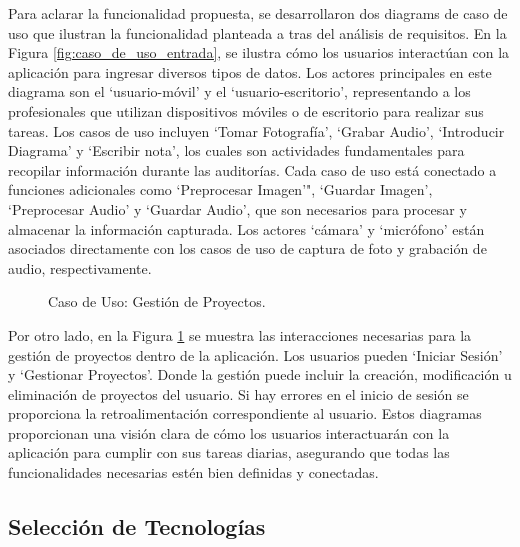 Para aclarar la funcionalidad propuesta, se desarrollaron dos diagrams de caso de uso que ilustran la funcionalidad planteada a tras del análisis de requisitos. En la Figura \ref{fig:caso_de_uso_entrada}, se ilustra cómo los usuarios interactúan con la aplicación para ingresar diversos tipos de datos. Los actores principales en este diagrama son el `usuario-móvil' y el `usuario-escritorio', representando a los profesionales que utilizan dispositivos móviles o de escritorio para realizar sus tareas. Los casos de uso incluyen `Tomar Fotografía', `Grabar Audio', `Introducir Diagrama' y `Escribir nota', los cuales son actividades fundamentales para recopilar información durante las auditorías. Cada caso de uso está conectado a funciones adicionales como `Preprocesar Imagen'", `Guardar Imagen', `Preprocesar Audio' y `Guardar Audio', que son necesarios para procesar y almacenar la información capturada. Los actores `cámara' y `micrófono' están asociados directamente con los casos de uso de captura de foto y grabación de audio, respectivamente.

\begin{figure}[h]
	\centering
    \resizebox{\textwidth}{!}{
        {\setlength{\fboxsep}{14pt} 
        \fbox{}}}
	\caption{Caso de Uso: Gestión de Proyectos.}
	\label{fig:caso_de_uso_gestion} 
\end{figure}

Por otro lado, en la Figura \ref{fig:caso_de_uso_gestion} se muestra las interacciones necesarias para la gestión de proyectos dentro de la aplicación. Los usuarios pueden `Iniciar Sesión' y `Gestionar Proyectos'. Donde la gestión puede incluir la creación, modificación u eliminación de proyectos del usuario. Si hay errores en el inicio de sesión se proporciona la retroalimentación correspondiente al usuario. Estos diagramas proporcionan una visión clara de cómo los usuarios interactuarán con la aplicación para cumplir con sus tareas diarias, asegurando que todas las funcionalidades necesarias estén bien definidas y conectadas.

\subsection{Selección de Tecnologías}

